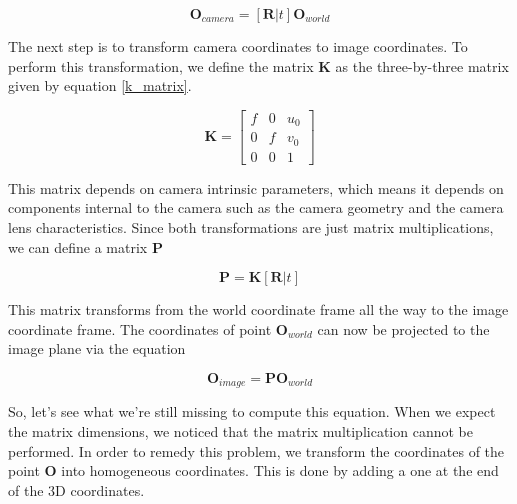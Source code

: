 \begin{equation}
\mathbf{O}_{camera} = [\mathbf{R}|t]\mathbf{O}_{world}
\end{equation}

The next step is to transform camera coordinates to
image coordinates. To perform this transformation, we define the matrix $\mathbf{K}$ as
the three-by-three matrix given by equation \ref{k_matrix}. 

\begin{equation}
\mathbf{K}=
\begin{bmatrix}
f & 0 & u_0 \\
0 & f & v_0 \\
0 & 0 & 1
\end{bmatrix}
\label{k_matrix}
\end{equation}

This matrix depends on camera intrinsic parameters, which means it depends on components internal to the camera such as the camera geometry and the camera lens
characteristics. Since both transformations are just matrix multiplications, we can define a matrix $\mathbf{P}$

\begin{equation}
\mathbf{P} = \mathbf{K}[\mathbf{R}|t]
\end{equation}


This matrix transforms from the world coordinate frame all the way to
the image coordinate frame. The coordinates of point $\mathbf{O}_{world}$ can now be projected to the image plane via the equation

\begin{equation}
\mathbf{O}_{image} = \mathbf{P} \mathbf{O}_{world}
\end{equation}

So, let's see what we're still missing to compute this equation. When we expect
the matrix dimensions, we noticed that the matrix multiplication cannot be performed. 
In order to remedy this problem, we transform the coordinates of the point $\mathbf{O}$ into
homogeneous coordinates. This is done by adding a one at the end of the 3D coordinates. 


